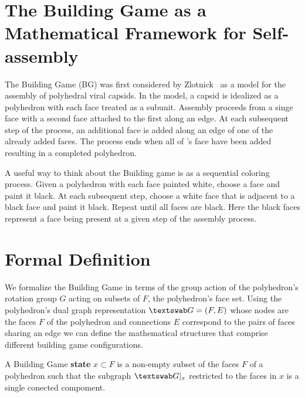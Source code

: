 
\section{The Building Game as a Mathematical Framework for Self-assembly}

The Building Game (BG) was first considered by Zlotnick~\cite{Zlotnick1994} as a model for the assembly of polyhedral viral capsids. In the model, a capsid is idealized as a polyhedron \poly\spc with each face treated as a subunit. Assembly proceeds from a singe face with a second face attached to the first along an edge. At each subsequent step of the process, an additional face is added along an edge of one of the already added faces. The process ends when all of \poly's face have been added resulting in a completed polyhedron.

A useful way to think about the Building game is as a sequential coloring process. Given a polyhedron with each face painted white, choose a face and paint it black. At each subsequent step, choose a white face that is adjacent to a black face and paint it black. Repeat until all faces are black. Here the black faces represent a face being present at a given step of the assembly process.

\section{Formal Definition}
We formalize the Building Game in terms of the group action of the polyhedron's rotation group $G$ acting on subsets of $F$, the polyhedron's face set. Using the polyhedron's dual graph representation $\PolyGraph = \left(F, E\right)$ whose nodes are the faces $F$ of the polyhedron and connections $E$ correspond to the pairs of faces sharing an edge we can define the mathematical structures that comprise different building game configurations.


\begin{mydef}
  A Building Game \textbf{state} $x \subset F$ is a non-empty subset of the faces $F$ of a polyhedron such that the subgraph $\PolyGraph|_x$ restricted to the faces in $x$ is a single conected compoment. 
\end{mydef} 

